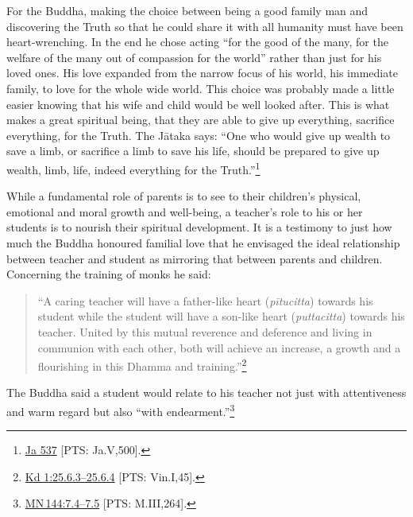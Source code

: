 \documentclass[10pt, openright]{book}
\begin{document}
For the Buddha, making the choice between being a good family man and discovering the Truth so that he could share it with all humanity must have been heart-wrenching. In the end he chose acting “for the good of the many, for the welfare of the many out of compassion for the world” rather than just for his loved ones. His love expanded from the narrow focus of his world, his immediate family, to love for the whole wide world. This choice was probably made a little easier knowing that his wife and child would be well looked after. This is what makes a great spiritual being, that they are able to give up everything, sacrifice everything, for the Truth. The Jātaka says: “One who would give up wealth to save a limb, or sacrifice a limb to save his life, should be prepared to give up wealth, limb, life, indeed everything for the Truth.”\footnote {\href{https://suttacentral.net/ja537/en/francis?reference=main/pts#pts-vp-pli500}{Ja 537} [PTS: Ja.V,500].}


While a fundamental role of parents is to see to their children’s physical, emotional and moral growth and well-being, a teacher’s role to his or her students is to nourish their spiritual development. It is a testimony to just how much the Buddha honoured familial love that he envisaged the ideal relationship between teacher and student as mirroring that between parents and children. Concerning the training of monks he said:


\begin{quote}


“A caring teacher will have a father-like heart (\textit{pītucitta}) towards his student while the student will have a son-like heart (\textit{puttacitta}) towards his teacher. United by this mutual reverence and deference and living in communion with each other, both will achieve an increase, a growth and a flourishing in this Dhamma and training.”\footnote {\href{https://suttacentral.net/pli-tv-kd1/en/brahmali#25.6.3}{Kd 1:25.6.3–25.6.4} [PTS: Vin.I,45].}




\end{quote}
The Buddha said a student would relate to his teacher not just with attentiveness and warm regard but also “with endearment.”\footnote {\href{https://suttacentral.net/mn144/en/sujato\#7.4}{MN 144:7.4–7.5} [PTS: M.III,264].}
\end{document}

